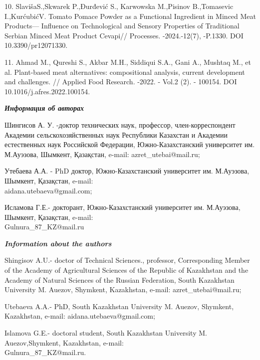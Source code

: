 \begin{references}
10. SlavišaS.,Skwarek P.,Đurđević S., Karwowska M.,Pisinov B.,Tomasevic
I.,KurćubićV. Tomato Pomace Powder as a Functional Ingredient in Minced
Meat Products--- Influence on Technological and Sensory Properties of
Traditional Serbian Minced Meat Product Cevapi// Processes.
-2024.-12(7), -P.1330. DOI 10.3390/pr12071330.

11. Ahmad M., Qureshi S., Akbar M.H., Siddiqui S.A., Gani A., Mushtaq
M., et al. Plant-based meat alternatives: compositional analysis,
current development and challenges. // Applied Food Research. -2022. -
Vol.2 (2). - 100154. DOI 10.1016/j.afres.2022.100154.
\end{references}

\begin{authorinfo}
\emph{{\bfseries Информация об авторах}}

Шингисов А. У. -доктор технических наук, профессор, член-корреспондент
Академии сельскохозяйственных наук Республики Казахстан и Академии
естественных наук Российской Федерации, Южно-Казахстанский университет
им. \\М.Ауэзова, Шымкент, Қазақстан, e-mail: azret\_utebai@mail.ru;

Утебаева А.А. - PhD доктор, Южно-Казахстанский университет им.
М.Ауэзова, Шымкент, Қазақстан, e-mail: \\aidana.utebaeva@gmail.com;

Исламова Г.Е.- докторант, Южно-Казахстанский университет им. М.Ауэзова,
Шымкент, Қазақстан, e-mail: \\Gulnura\_87\_KZ@mail.ru

\emph{{\bfseries Information about the authors}}

Shingisov A.U.- doctor of Technical Sciences., professor, Corresponding
Member of the Academy of Agricultural Sciences of the Republic of
Kazakhstan and the Academy of Natural Sciences of the Russian
Federation, South Kazakhstan University M. Auezov, Shymkent,
Kazakhstan, e-mail: azret\_utebai@mail.ru;

Utebaeva A.A.- PhD, South Kazakhstan University M. Auezov, Shymkent,
Kazakhstan, e-mail: aidana.utebaeva@gmail.com;

Islamova G.E.- doctoral student, South Kazakhstan University M.
Auezov,Shymkent, Kazakhstan, e-mail: \\Gulnura\_87\_KZ@mail.ru.
\end{authorinfo}
